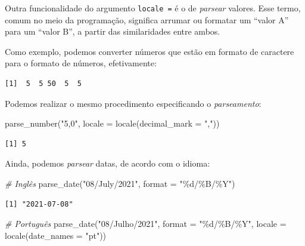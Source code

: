\documentclass[
  brazilian,
]{book}
\newenvironment{Shaded}{\begin{snugshade}}{\end{snugshade}}
\newcommand{\AttributeTok}[1]{\textcolor[rgb]{0.77,0.63,0.00}{#1}}
\newcommand{\CommentTok}[1]{\textcolor[rgb]{0.56,0.35,0.01}{\textit{#1}}}
\newcommand{\FunctionTok}[1]{\textcolor[rgb]{0.00,0.00,0.00}{#1}}
\newcommand{\NormalTok}[1]{#1}
\newcommand{\StringTok}[1]{\textcolor[rgb]{0.31,0.60,0.02}{#1}}
\begin{document}
Outra funcionalidade do argumento \texttt{locale\ =} é o de \emph{parsear} valores. Esse termo, comum no meio da programação, significa arrumar ou formatar um ``valor A'' para um ``valor B'', a partir das similaridades entre ambos.

Como exemplo, podemos converter números que estão em formato de caractere para o formato de números, efetivamente:

\begin{Shaded}
\end{Shaded}

\begin{verbatim}
[1]  5  5 50  5  5
\end{verbatim}

Podemos realizar o mesmo procedimento especificando o \emph{parseamento}:

\begin{Shaded}
\begin{Highlighting}[]
\FunctionTok{parse\_number}\NormalTok{(}\StringTok{"5,0"}\NormalTok{, }\AttributeTok{locale =} \FunctionTok{locale}\NormalTok{(}\AttributeTok{decimal\_mark =} \StringTok{","}\NormalTok{))}
\end{Highlighting}
\end{Shaded}

\begin{verbatim}
[1] 5
\end{verbatim}

Ainda, podemos \emph{parsear} datas, de acordo com o idioma:

\begin{Shaded}
\begin{Highlighting}[]
\CommentTok{\# Inglês}
\FunctionTok{parse\_date}\NormalTok{(}\StringTok{"08/July/2021"}\NormalTok{,}
           \AttributeTok{format =} \StringTok{"\%d/\%B/\%Y"}\NormalTok{)}
\end{Highlighting}
\end{Shaded}

\begin{verbatim}
[1] "2021-07-08"
\end{verbatim}

\begin{Shaded}
\begin{Highlighting}[]
\CommentTok{\# Português}
\FunctionTok{parse\_date}\NormalTok{(}\StringTok{"08/Julho/2021"}\NormalTok{,}
           \AttributeTok{format =} \StringTok{"\%d/\%B/\%Y"}\NormalTok{,}
           \AttributeTok{locale =} \FunctionTok{locale}\NormalTok{(}\AttributeTok{date\_names =} \StringTok{"pt"}\NormalTok{))}
\end{Highlighting}
\end{Shaded}
\end{document}
